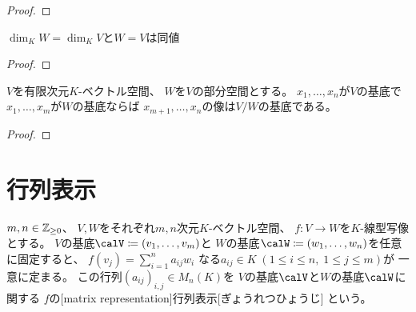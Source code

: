 \documentclass[report]{jlreq}
\begin{document}
\begin{proof}
    \TODO{}
\end{proof}

\begin{proposition}[次元と部分空間]
    $\dim_K W = \dim_K V$と$W = V$は同値
    \TODO{}
\end{proposition}

\begin{proof}
    \TODO{}
\end{proof}

\begin{proposition}[商ベクトル空間の基底]
    $V$を有限次元$K$-ベクトル空間、
    $W$を$V$の部分空間とする。
    $x_1, \dots, x_n$が$V$の基底で
    $x_1, \dots, x_m$が$W$の基底ならば
    $x_{m + 1}, \dots, x_n$の像は$V / W$の基底である。
\end{proposition}

\begin{proof}
    \TODO{}
\end{proof}

%
\section{行列表示}

\begin{definition}[行列表示]
    $m, n \in \mathbb{Z}_{\ge 0}$、
    $V, W$をそれぞれ$m, n$次元$K$-ベクトル空間、
    $f \colon V \to W$を$K$-線型写像とする。
    $V$の基底$\calV \coloneqq (v_1, \dots, v_m)$と
    $W$の基底$\calW \coloneqq (w_1, \dots, w_n)$を任意に固定すると、
    $f(v_j) = \sum_{i = 1}^n a_{ij} w_i$
    なる$a_{ij} \in K \; (1 \le i \le n, \; 1 \le j \le m)$が
    一意に定まる。
    この行列$(a_{ij})_{i, j} \in M_n(K)$を
    $V$の基底$\calV$と$W$の基底$\calW$に関する
    $f$の[matrix representation]{行列表示}[ぎょうれつひょうじ]
    という。
\end{definition}

\end{document}
